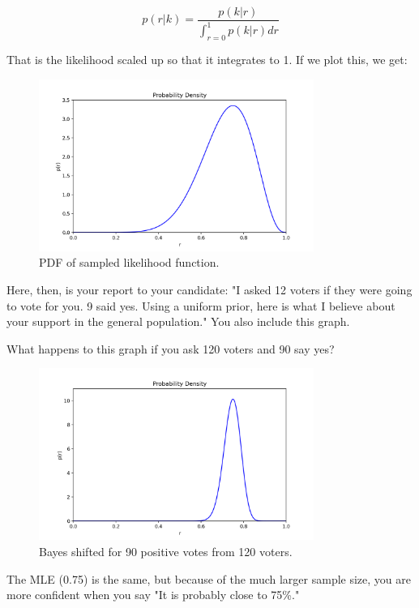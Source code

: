 $$p(r|k) = \frac{p(k | r)}{\int_{r = 0}^{1} p(k | r) dr}$$

That is the likelihood scaled up so that it integrates to 1. If we plot this, we get:
\begin{figure}[htbp]
    \centering
    \includegraphics[width=0.8\textwidth]{bayes.png}
    \caption{PDF of sampled likelihood function.}
    \label{fig:bayes_dist}
\end{figure}

Here, then, is your report to your candidate: "I asked 12 voters if they were going to vote for you. 9 said yes. Using a uniform prior, here is what I believe about your support in the general 
population." You also include this graph.

What happens to this graph if you ask 120 voters and 90 say yes?
\begin{figure}[htbp]
    \centering
    \includegraphics[width=0.8\textwidth]{bayes_tight.png}
    \caption{Bayes shifted for 90 positive votes from 120 voters.}
    \label{fig:bayes_dist_tight}
\end{figure}

The MLE (0.75) is the same, but because of the much larger sample size,  you are more confident when you say "It is probably close to 75\%."

